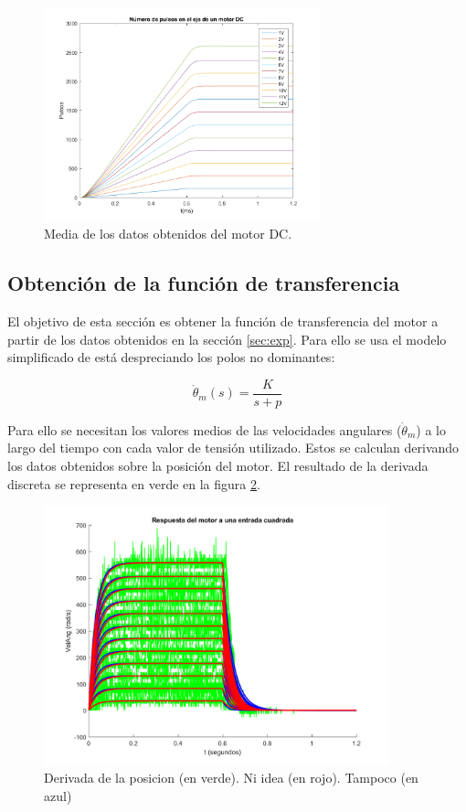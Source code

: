 \documentclass[a4paper]{article}
\begin{document}
\begin{figure}[hbp]
	\begin{center}
		\includegraphics[width=8cm]{n_pulsos}
		\caption{Media de los datos obtenidos del motor DC.}
		\label{datos}
	\end{center}
\end{figure}

\subsection{Obtención de la función de transferencia}
El objetivo de esta sección es obtener la función de transferencia del motor a partir de los datos obtenidos en la sección \ref{sec:exp}.
Para ello se usa el modelo simplificado de está despreciando los polos no dominantes:

\begin{equation}
	\label{eq:trans}
	\dot{\theta}_m (s) = \frac{K}{s+p}
\end{equation}


Para ello se necesitan los valores medios de las velocidades angulares ($\dot{\theta}_m$) a lo largo del tiempo con cada valor de tensión utilizado.
Estos se calculan derivando los datos obtenidos sobre la posición del motor. El resultado de la derivada discreta se representa en verde en la figura \ref{velAng}.

\begin{figure}[htbp]
	\begin{center}

		\includegraphics[width=10cm]{vel_ang}
		\caption{Derivada de la posicion (en verde). Ni idea (en rojo). Tampoco (en azul)}
		\label{velAng}
	\end{center}
\end{figure}
\end{document}
